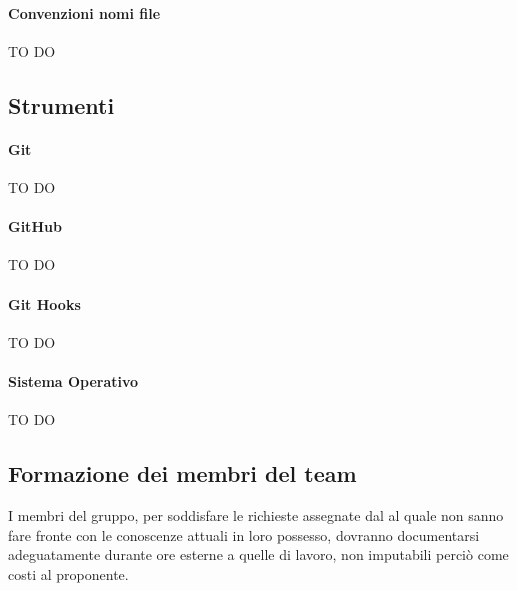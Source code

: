 			\paragraph{Convenzioni nomi file }
TO DO
			
		\subsection{Strumenti}
			\paragraph{Git}
TO DO			
			\paragraph{GitHub}
TO DO			
			\paragraph{Git Hooks}
TO DO			
			\paragraph{Sistema Operativo}
TO DO

	\subsection{Formazione dei membri del team}
I membri del gruppo, per soddisfare le richieste assegnate dal \roleProjectManager{} al quale non sanno fare fronte con le conoscenze attuali in loro possesso, dovranno documentarsi adeguatamente durante ore esterne a quelle di lavoro, non imputabili perciò come costi al proponente.